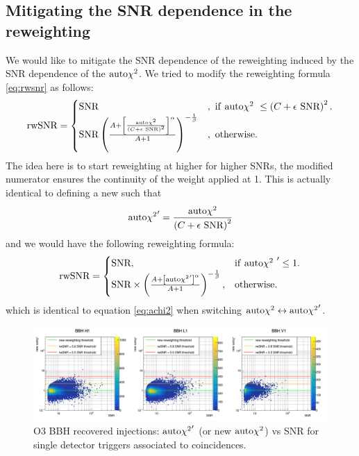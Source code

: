 \subsection{Mitigating the SNR dependence in the reweighting}
\label{sec:new_reweight}
We would like to  mitigate the SNR dependence of the reweighting induced by the SNR dependence of the $\textrm{auto$\chi^2$}$.
We tried to modify the reweighting formula \ref{eq:rwsnr} as follows:
%
\begin{equation}
\label{eq:new_rwsnr}
    \textrm{rwSNR} = \begin{cases}
    \textrm{SNR} &, \textrm{ if \textrm{auto$\chi^2$} } \leq \left(C+\epsilon\textrm{ SNR}\right)^2.\\
    \textrm{SNR}\left( \frac{ A+\left[\frac{\textrm{auto$\chi^2$}}{\left(C+\epsilon\textrm{ SNR}\right)^2}\right]^\alpha }{A+1} \right)^{-\frac{1}{\beta}} &, \textrm{ otherwise}.
  \end{cases}
\end{equation}
%
The idea here is to start reweighting at higher \achi for higher SNRs, the modified numerator ensures the continuity of the weight applied at 1.
This is actually identical to defining a new \achi such that
%
\begin{equation}
\label{eq:new_achi2}
    \textrm{auto$\chi^2$}' = \frac{\textrm{auto$\chi^2$}}{\left(C+\epsilon\textrm{ SNR}\right)^2}
\end{equation}
%
and we would have the following reweighting formula:
%
\begin{equation}
\label{eq:new_old_rwsnr}
    \textrm{rwSNR} = \begin{cases}
    \textrm{SNR}, & \textrm{if \textrm{auto$\chi^2$} }' \leq 1.\\
    \textrm{SNR} \times \left( \frac{ A+\left[\textrm{auto$\chi^2$}'\right]^\alpha }{ A+1 } \right)^{-\frac{1}{\beta}}, & \text{otherwise}.
  \end{cases}
\end{equation}
%
which is identical to equation \ref{eq:achi2} when switching $\textrm{auto$\chi^2$} \leftrightarrow \textrm{auto$\chi^2$}'$.
%
\begin{figure}[ht]
    \centering
    \includegraphics[width=\textwidth]{sectionImprovement/rwSNR/cSnrAchi2P.png}
    \caption{O3 BBH recovered injections: $\textrm{auto$\chi^2$}'$ (or new $\textrm{auto$\chi^2$}$) vs SNR for single detector triggers associated to coincidences.}
    \label{fig:new_achi2vsSNR}
\end{figure}
%


